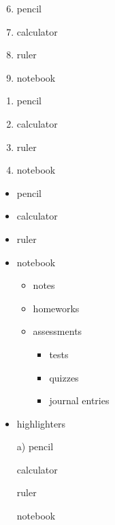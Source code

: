 \documentclass[12pt]{article}
\begin{document}
\begin{enumerate} \setcounter{enumi}{5}
\item pencil
\item calculator
\item ruler
\item notebook
\end{enumerate}

\vspace{1cm}

\begin{enumerate} 
\item pencil
\item calculator
\item ruler
\item notebook
\end{enumerate}

\pagebreak

\begin{itemize}
\item pencil
\item calculator
\item ruler
\item notebook
	\begin{itemize}
	\item notes
	\item homeworks
	\item assessments
		\begin{itemize}
		\item tests
		\item quizzes
		\item journal entries
		\end{itemize}
	\end{itemize}
\item highlighters
\end{itemize}

\vspace{1cm}

\begin{enumerate}
\item[a)] pencil
\item[] calculator
\item[] ruler
\item[] notebook
\end{enumerate}
\end{document}
